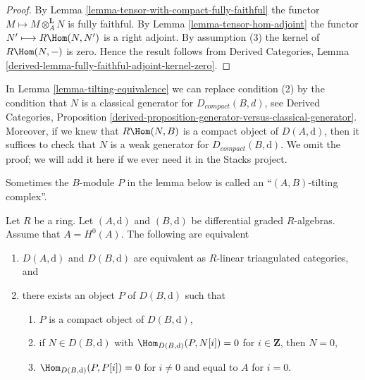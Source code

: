 \begin{proof}
By Lemma \ref{lemma-tensor-with-compact-fully-faithful}
the functor $M \longmapsto M \otimes_A^\mathbf{L} N$ is
fully faithful. By Lemma \ref{lemma-tensor-hom-adjoint}
the functor $N' \longmapsto R\Hom(N, N')$ is a right adjoint.
By assumption (3) the kernel of $R\Hom(N, -)$ is zero.
Hence the result follows from
Derived Categories, Lemma
\ref{derived-lemma-fully-faithful-adjoint-kernel-zero}.
\end{proof}

\begin{remark}
\label{remark-tilting-equivalence}
In Lemma \ref{lemma-tilting-equivalence} we can replace
condition (2) by the condition that $N$ is a classical
generator for $D_{compact}(B, d)$, see
Derived Categories, Proposition
\ref{derived-proposition-generator-versus-classical-generator}.
Moreover, if we knew that $R\Hom(N, B)$ is a compact object
of $D(A, \text{d})$, then it suffices to check that $N$
is a weak generator for $D_{compact}(B, \text{d})$.
We omit the proof; we will add it here if we ever
need it in the Stacks project.
\end{remark}

\noindent
Sometimes the $B$-module $P$ in the lemma below is called an
``$(A, B)$-tilting complex''.

\begin{lemma}
\label{lemma-rickard}
Let $R$ be a ring. Let $(A, \text{d})$ and $(B, \text{d})$ be
differential graded $R$-algebras. Assume that $A = H^0(A)$.
The following are equivalent
\begin{enumerate}
\item $D(A, \text{d})$ and $D(B, \text{d})$ are equivalent as $R$-linear
triangulated categories, and
\item there exists an object $P$ of $D(B, \text{d})$ such that
\begin{enumerate}
\item $P$ is a compact object of $D(B, \text{d})$,
\item if $N \in D(B, \text{d})$ with $\Hom_{D(B, \text{d})}(P, N[i]) = 0$
for $i \in \mathbf{Z}$, then $N = 0$,
\item $\Hom_{D(B, \text{d})}(P, P[i]) = 0$ for $i \not = 0$ and
equal to $A$ for $i = 0$.
\end{enumerate}
\end{enumerate}
\end{lemma}

